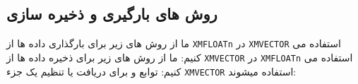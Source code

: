 \subsection{\textbf{روش های بارگیری و ذخیره سازی}}
\label{subsec:1.6.2}
{
    \Large
    \begin{spacing}{1.5}
        ما از روش های زیر برای بارگذاری داده ها از \texttt{XMFLOATn} در \texttt{XMVECTOR} استفاده می کنیم:
        \textbf{\vspace{4pt}}
        \lr{}
        \textbf{\vspace{3pt}}
        ما از روش های زیر برای ذخیره داده ها از \texttt{XMVECTOR} در \texttt{XMFLOATn} استفاده می کنیم:
        \textbf{\vspace{4pt}}
        \lr{}
        \textbf{\vspace{3pt}}
        توابع  و  برای دریافت یا تنظیم یک جزء \texttt{XMVECTOR} استفاده میشوند:
        \textbf{\vspace{4pt}}
        \lr{}
    \end{spacing}
}

\textbf{\vspace{-65pt}}


